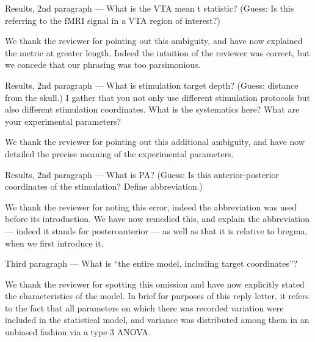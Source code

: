\reviewersection

\begin{point}
	Results, 2nd paragraph --- What is the VTA mean t statistic? (Guess: Is this referring to the fMRI signal in a VTA region of interest?)
\end{point}
\begin{reply}
	We thank the reviewer for pointing out this ambiguity, and have now explained the metric at greater length.
	Indeed the intuition of the reviewer was correct, but we concede that our phrasing was too parsimonious.
\end{reply}

\begin{point}
	Results, 2nd paragraph --- What is stimulation target depth? (Guess: distance from the skull.) I gather that you not only use different stimulation protocols but also different stimulation coordinates. What is the systematics here? What are your experimental parameters?
\end{point}
\begin{reply}
	We thank the reviewer for pointing out this additional ambiguity, and have now detailed the precise meaning of the experimental parameters.
\end{reply}

\begin{point}
	Results, 2nd paragraph --- What is PA? (Guess: Is this anterior-posterior coordinates of the stimulation? Define abbreviation.)
\end{point}
\begin{reply}
	We thank the reviewer for noting this error, indeed the abbreviation was used before its introduction.
	We have now remedied this, and explain the abbreviation --- indeed it stands for posteroanterior --- as well as that it is relative to bregma, when we first introduce it.
\end{reply}

\begin{point}
	Third paragraph --- What is “the entire model, including target coordinates”?
\end{point}
\begin{reply}
	We thank the reviewer for spotting this omission and have now explicitly stated the characteristics of the model.
	In brief for purposes of this reply letter, it refers to the fact that all parameters on which there was recorded variation were included in the statistical model, and variance was distributed among them in an unbiased fashion via a type 3 ANOVA.
\end{reply}

